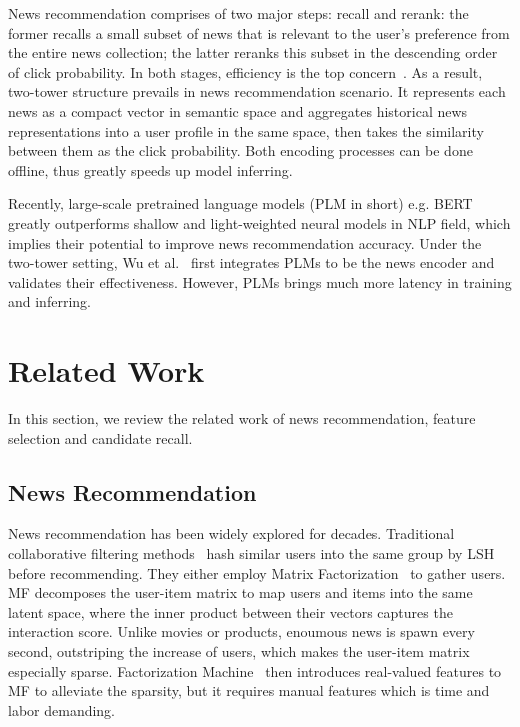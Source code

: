 \documentclass[sigconf,anonymous]{acmart}
\begin{document}
News recommendation comprises of two major steps: recall and rerank: the former recalls a small subset of news that is relevant to the user's preference from the entire news collection; the latter reranks this subset in the descending order of click probability. In both stages, efficiency is the top concern~\cite{liu_Hifi-ark,LightRec}. As a result, two-tower structure prevails in news recommendation scenario. It represents each news as a compact vector in semantic space and aggregates historical news representations into a user profile in the same space, then takes the similarity between them as the click probability. Both encoding processes can be done offline, thus greatly speeds up model inferring.

Recently, large-scale pretrained language models (PLM in short) e.g. BERT~\cite{Bert} greatly outperforms shallow and light-weighted neural models in NLP field, which implies their potential to improve news recommendation accuracy. Under the two-tower setting, Wu et al.~\cite{wu_newsPLM} first integrates PLMs to be the news encoder and validates their effectiveness. However, PLMs brings much more latency in training and inferring.


\section{Related Work}
\label{section:related work}
In this section, we review the related work of news recommendation, feature selection and candidate recall.
\subsection{News Recommendation}
News recommendation has been widely explored for decades. Traditional collaborative filtering methods~\cite{das_CF, li_SCENE} hash similar users into the same group by LSH before recommending. They either employ Matrix Factorization~\cite{koren_MF} to gather users. MF decomposes the user-item matrix to map users and items into the same latent space, where the inner product between their vectors captures the interaction score. Unlike movies or products, enoumous news is spawn every second, outstriping the increase of users, which makes the user-item matrix especially sparse. Factorization Machine~\cite{rendle_FM} then introduces real-valued features to MF to alleviate the sparsity, but it requires manual features which is time and labor demanding.
\end{document}
